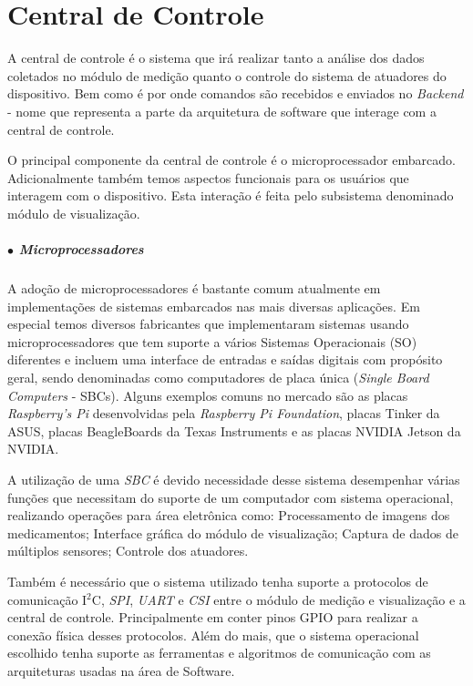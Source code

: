 
\section{Central de Controle}

A central de controle é o sistema que irá realizar tanto a análise dos dados coletados no módulo de medição quanto o controle do sistema de atuadores do dispositivo. Bem como é por onde comandos são recebidos e enviados  no \textit{Backend} - nome que representa a parte da arquitetura de software que interage com a central de controle. 

O principal componente da central de controle é o microprocessador embarcado. Adicionalmente também temos aspectos funcionais para os usuários que interagem com o dispositivo. Esta interação é feita pelo subsistema denominado módulo de visualização.

    \subparagraph*{$\bullet$ Microprocessadores}  \hfill
    
    A adoção de microprocessadores é bastante comum atualmente em implementações de sistemas embarcados nas mais diversas aplicações. Em especial temos diversos fabricantes que implementaram sistemas usando microprocessadores que tem suporte a vários Sistemas Operacionais (SO) diferentes e incluem uma interface de entradas e saídas digitais com propósito geral, sendo denominadas como computadores de placa única (\textit{Single Board Computers} - SBCs). Alguns exemplos comuns no mercado são as placas \textit{Raspberry's Pi} desenvolvidas pela \textit{Raspberry Pi Foundation}, placas Tinker da ASUS, placas BeagleBoards da Texas Instruments e as placas NVIDIA Jetson da NVIDIA. 
    
    A utilização de uma \textit{SBC} é devido necessidade desse sistema desempenhar várias funções que necessitam do suporte de um computador com sistema operacional, realizando  operações para área eletrônica como: Processamento de imagens dos medicamentos; Interface gráfica do módulo de visualização; Captura de dados de múltiplos sensores; Controle dos atuadores.
    
    Também é necessário que o sistema utilizado tenha suporte a protocolos de comunicação I$^2$C, \textit{SPI}, \textit{UART} e \textit{CSI} entre o módulo de medição e visualização e a central de controle. Principalmente em conter pinos GPIO para realizar a conexão física desses protocolos. Além do mais, que o sistema operacional escolhido tenha suporte as ferramentas e algoritmos de comunicação com as arquiteturas usadas na área de Software.
    
